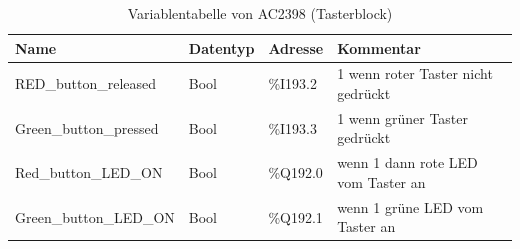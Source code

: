 \clearpage

\begin{table}[h!]
	\centering
	\renewcommand{\arraystretch}{1.0} %
	\footnotesize
	\begin{tabular}{|l|l|l|l|}
		\hline
		\textbf{Name} & \textbf{Datentyp} & \textbf{Adresse} & \textbf{Kommentar}\\ \hline
		RED\_button\_released & Bool & \%I193.2 & 1 wenn roter Taster nicht gedrückt \\ \hline
		Green\_button\_pressed & Bool & \%I193.3 & 1 wenn grüner Taster gedrückt \\ \hline
		Red\_button\_LED\_ON & Bool & \%Q192.0 & wenn 1 dann rote LED vom Taster an \\ \hline
		Green\_button\_LED\_ON & Bool & \%Q192.1 & wenn 1 grüne LED vom Taster an \\ \hline
	\end{tabular}
	\caption{Variablentabelle von AC2398 (Tasterblock)}
	\label{tab:AC2398}
\end{table}
